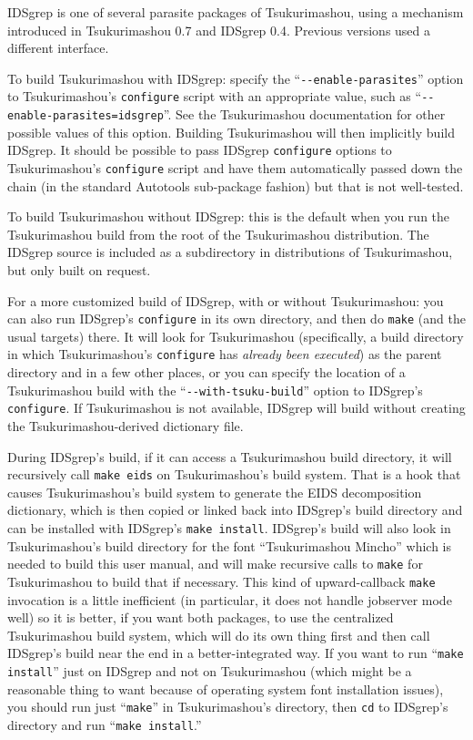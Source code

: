 \documentclass[twocolumn]{report}
\begin{document}
IDSgrep is one of several parasite packages of Tsukurimashou, using a
mechanism introduced in Tsukurimashou 0.7 and IDSgrep 0.4.  Previous
versions used a different interface.

To build Tsukurimashou with IDSgrep:  specify the
``\texttt{-{}-enable-parasites}'' option to Tsukurimashou's
\texttt{configure} script with an appropriate value, such as
``\texttt{-{}-enable-parasites=idsgrep}''.  See the Tsukurimashou
documentation for other possible values of this option.  Building
Tsukurimashou will then implicitly build IDSgrep.  It should be possible to
pass IDSgrep \texttt{configure} options to Tsukurimashou's
\texttt{configure} script and have them automatically passed down the chain
(in the standard Autotools sub-package fashion) but that is not well-tested.

To build Tsukurimashou without IDSgrep:  this is the default when you run
the Tsukurimashou build from the root of the Tsukurimashou distribution. 
The IDSgrep source is included as a subdirectory in distributions of
Tsukurimashou, but only built on request.

For a more customized build of IDSgrep, with or without Tsukurimashou:  you
can also run IDSgrep's \texttt{configure} in its own directory, and then do
\texttt{make} (and the usual targets) there.  It will look for Tsukurimashou
(specifically, a build directory in which Tsukurimashou's \texttt{configure}
has \emph{already been executed}) as the parent directory and in a few other
places, or you can specify the location of a Tsukurimashou build with the
``\texttt{-{}-with-tsuku-build}'' option to IDSgrep's \texttt{configure}.  If
Tsukurimashou is not available, IDSgrep will build without creating
the Tsukurimashou-derived dictionary file.

During IDSgrep's build, if it can access a Tsukurimashou build directory, it
will recursively call \texttt{make eids} on Tsukurimashou's build system. 
That is a hook that causes Tsukurimashou's build system to generate the EIDS
decomposition dictionary, which is then copied or linked back into IDSgrep's
build directory and can be installed with IDSgrep's \texttt{make install}. 
IDSgrep's build will also look in Tsukurimashou's build directory for the
font ``Tsukurimashou Mincho'' which is needed to build this user manual, and
will make recursive calls to \texttt{make} for Tsukurimashou to build that
if necessary.  This kind of upward-callback \texttt{make} invocation is a
little inefficient (in particular, it does not handle jobserver mode well)
so it is better, if you want both packages, to use the centralized
Tsukurimashou build system, which will do its own thing first and then call
IDSgrep's build near the end in a better-integrated way.  If you want to
run ``\texttt{make install}'' just on IDSgrep and not on Tsukurimashou
(which might be a reasonable thing to want because of operating system font
installation issues), you should run just ``\texttt{make}'' in
Tsukurimashou's directory, then \texttt{cd} to IDSgrep's directory and run
``\texttt{make install}.''
\end{document}
